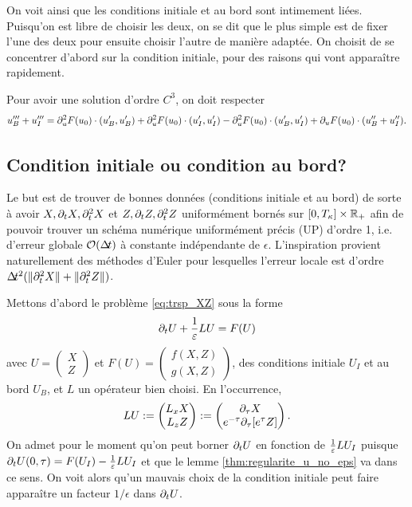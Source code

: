 On voit ainsi que les conditions initiale et au bord sont intimement liées. 
Puisqu'on est libre de choisir les deux, on se dit que le plus simple est de fixer l'une des deux pour ensuite choisir l'autre de manière adaptée. 
On choisit de se concentrer d'abord sur la condition initiale, pour des raisons qui vont apparaître rapidement. 

\begin{remark}
Pour avoir une solution d'ordre $C^3$, on doit respecter 
$$
u_B''' + u_I''' = \partial_{u}^2 F(u_0)\cdot(u_B',u_B') + \partial_{u}^2 F(u_0)\cdot(u_I',u_I') - \partial_{u}^2 F(u_0)\cdot(u_B',u_I') + \partial_{u} F(u_0)\cdot(u_B''+u_I'') .
$$
\end{remark}

\subsection{Condition initiale ou condition au bord?}

Le but est de trouver de bonnes données (conditions initiale et au bord) de sorte à avoir $X,\partial_t X, \partial_t^2 X$ et $Z,\partial_t Z, \partial_t^2 Z$ uniformément bornés sur $[0,T_{\kappa}]\times\mathbb{R}_+$ afin de pouvoir trouver un schéma numérique uniformément précis (UP) d'ordre 1, i.e. d'erreur globale $\mathcal{O}(\Delta\!\!\!\ t)$ à constante indépendante de $\epsilon$. 
L'inspiration provient naturellement des méthodes d'Euler pour lesquelles l'erreur locale est d'ordre $\Delta\!\!\!\ t^2 (\|\partial_t^2 X\| + \|\partial_t^2 Z\|)$. 

Mettons d'abord le problème \eqref{eq:trsp_XZ} sous la forme 
\begin{equation} \label{eq:trsp_U_L}
\partial_t U + \frac{1}{\varepsilon} LU = F(U) 
\end{equation} 
avec $U = \begin{pmatrix} X \\ Z \end{pmatrix}$ et $F(U) = \begin{pmatrix} f(X,Z) \\ g(X,Z) \end{pmatrix}$, des conditions initiale $U_I$ et au bord $U_B$, et $L$ un opérateur bien choisi. En l'occurrence, 
$$ LU := \begin{pmatrix} L_x X \\ L_z Z \end{pmatrix} := \begin{pmatrix} \partial_{\tau} X \\ e^{-\tau} \partial_{\tau} [e^{\tau} Z] \end{pmatrix}. $$
On admet pour le moment qu'on peut borner $\partial_t U$ en fonction de $\frac{1}{\varepsilon} LU_I$ puisque $\partial_t U(0,\tau) = F(U_I) - \frac{1}{\varepsilon} LU_I$ et que le lemme \ref{thm:regularite_u_no_eps} va dans ce sens. 
On voit alors qu'un mauvais choix de la condition initiale peut faire apparaître un facteur $1/\epsilon$ dans $\partial_t U$. 

